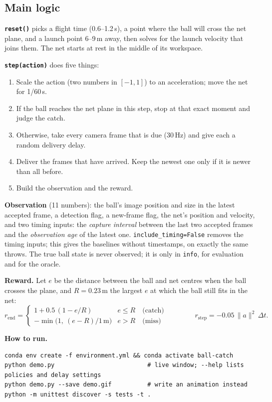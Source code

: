 \documentclass[10pt,a4paper]{article}
\newcommand{\code}[1]{\texttt{#1}}
\begin{document}
\subsection{Main logic}

\textbf{\code{reset()}} picks a flight time (0.6--1.2\,s), a point where the ball will cross the
net plane, and a launch point 6--9\,m away, then solves for the launch velocity that joins them.
The net starts at rest in the middle of its workspace.

\textbf{\code{step(action)}} does five things:
\begin{enumerate}
  \item Scale the action (two numbers in $[-1,1]$) to an acceleration; move the net for 1/60\,s.
  \item If the ball reaches the net plane in this step, stop at that exact moment and judge the catch.
  \item Otherwise, take every camera frame that is due (30\,Hz) and give each a random delivery delay.
  \item Deliver the frames that have arrived. Keep the newest one only if it is newer than all before.
  \item Build the observation and the reward.
\end{enumerate}

\textbf{Observation} (11 numbers): the ball's image position and size in the latest accepted frame,
a detection flag, a new-frame flag, the net's position and velocity, and two timing inputs: the
\emph{capture interval} between the last two accepted frames and the \emph{observation age} of the
latest one. \code{include\_timing=False} removes the timing inputs; this gives the baselines without
timestamps, on exactly the same throws. The true ball state is never observed; it is only in
\code{info}, for evaluation and for the oracle.

\textbf{Reward.} Let $e$ be the distance between the ball and net centres when the ball crosses the
plane, and $R = 0.23$\,m the largest $e$ at which the ball still fits in the net:
\[
  r_{\text{end}} =
  \begin{cases}
    1 + 0.5\,(1 - e/R) & e \le R \quad \text{(catch)}\\[2pt]
    -\min\!\big(1,\ (e - R)/1\,\text{m}\big) & e > R \quad \text{(miss)}
  \end{cases}
  \qquad\qquad
  r_{\text{step}} = -0.05\,\lVert a \rVert^2\,\Delta t .
\]

\textbf{How to run.}
{\small
\begin{verbatim}
conda env create -f environment.yml && conda activate ball-catch
python demo.py                          # live window; --help lists policies and delay settings
python demo.py --save demo.gif          # write an animation instead
python -m unittest discover -s tests -t .
\end{verbatim}
}
\end{document}
